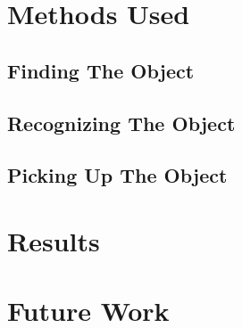 \documentclass[a4paper,10pt]{article}
\begin{document}
\section{Methods Used}

\subsection{Finding The Object}

\subsection{Recognizing The Object}

\subsection{Picking Up The Object}




\section{Results}

\section{Future Work}
\end{document}
